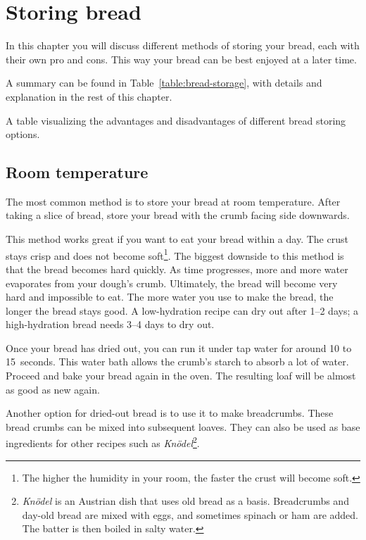 \chapter{Storing bread}%
\label{chapter:storing-bread}
\begin{quoting}
In this chapter you will discuss different methods of storing your bread, each
with their own pro and cons.  This way your bread can be best enjoyed at a
later time.
\end{quoting}

A summary can be found in Table~\ref{table:bread-storage}, with details and
explanation in the rest of this chapter.
\begin{table}[!htb]
    \centering
        
        \caption[Options to store bread]{A table visualizing the advantages
            and disadvantages of different bread storing options.}%
        \label{table:bread-storage}
\end{table}

\section{Room temperature}

The most common method is to store your bread
at room temperature. After taking a slice of bread,
store your bread with the crumb facing side
downwards.

This method works great if you want to eat
your bread within a day. The crust stays
crisp and does not become soft\footnote{The higher the humidity in your room,
    the faster the crust will become soft.}.
The biggest downside to this method is that
the bread becomes hard quickly. As time progresses,
more and more water evaporates from your dough's
crumb. Ultimately, the bread will become very hard
and impossible to eat. The more water you use
to make the bread, the longer the bread stays good.
A low-hydration recipe can dry out after 1--2 days;
a high-hydration bread needs 3--4 days to dry out.

Once your bread has dried out, you can run it under
tap water for around 10 to 15~seconds.
This water bath allows the
crumb's starch to absorb a lot of water. Proceed and
bake your bread again in the oven. The resulting loaf
will be almost as good as new again.

Another option for dried-out bread is to use it
to make breadcrumbs. These bread crumbs can be mixed
into subsequent loaves. They can also be used as
base ingredients for other recipes such as \emph{Knödel}\footnote{\emph{Knödel} is an
    Austrian dish that uses old bread as a basis.
  Breadcrumbs and day-old bread are mixed with eggs, and sometimes
  spinach or ham are added. The batter is then boiled in salty water.
}.


